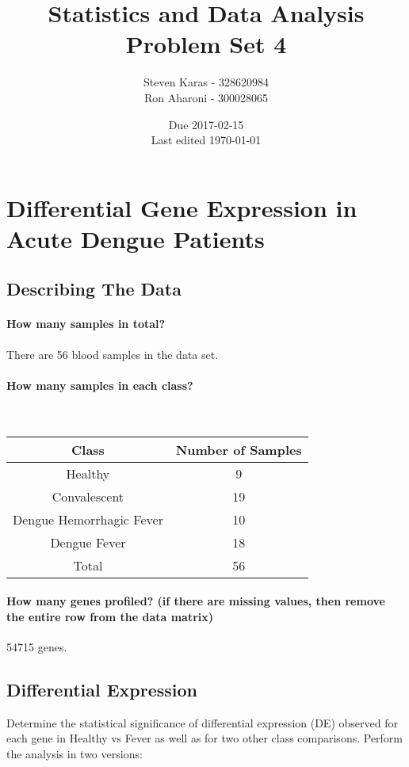 \documentclass[a4paper]{article}
\title{Statistics and Data Analysis \\ \large Problem Set 4}
\date{Due 2017-02-15 \\ Last edited \today}
\author{Steven Karas - 328620984 \\ Ron Aharoni - 300028065}
\begin{document}
\maketitle

\section{Differential Gene Expression in Acute Dengue Patients}

\subsection{Describing The Data}

\paragraph{How many samples in total?}

There are 56 blood samples in the data set.

\paragraph{How many samples in each class?}

\ \\
\begin{tabu} to \linewidth {c|c}
  Class & Number of Samples \\
  \hline
  Healthy & 9 \\
  Convalescent & 19 \\
  Dengue Hemorrhagic Fever & 10 \\
  Dengue Fever & 18 \\
  \hline
  Total & 56
\end{tabu}

\paragraph{How many genes profiled? (if there are missing values, then remove the entire row from the data matrix)}

54715 genes.

\subsection{Differential Expression}

Determine the statistical significance of differential expression (DE) observed for each gene in Healthy vs Fever as well as for two other class comparisons. Perform the analysis in two versions:
\end{document}
